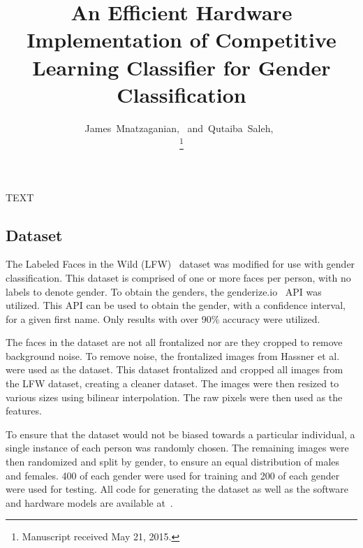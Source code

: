 \documentclass[10pt,journal]{IEEEtran}
\begin{document}
	
	\title{An Efficient Hardware Implementation of Competitive Learning Classifier for Gender Classification}
	
	\author{
		James~Mnatzaganian,~
        and~Qutaiba~Saleh,~%
	
		
		\thanks{Manuscript received May 21, 2015.}
	}
	
	

	\maketitle
	\IEEEdisplaynontitleabstractindextext
	
		TEXT
	
	\subsection{Dataset}
		The Labeled Faces in the Wild (LFW)~\cite{lfw} dataset was modified for use with gender classification. This dataset is comprised of one or more faces per person, with no labels to denote gender. To obtain the genders, the genderize.io~\cite{genderize} API was utilized. This API can be used to obtain the gender, with a confidence interval, for a given first name. Only results with over 90\% accuracy were utilized.
		
		The faces in the dataset are not all frontalized nor are they cropped to remove background noise. To remove noise, the frontalized images from Hassner et al.~\cite{frontalize} were used as the dataset. This dataset frontalized and cropped all images from the LFW dataset, creating a cleaner dataset. The images were then resized to various sizes using bilinear interpolation. The raw pixels were then used as the features.
		
		To ensure that the dataset would not be biased towards a particular individual, a single instance of each person was randomly chosen. The remaining images were then randomized and split by gender, to ensure an equal distribution of males and females. 400 of each gender were used for training and 200 of each gender were used for testing. All code for generating the dataset as well as the software and hardware models are available at~\cite{gitrepo}.
	
\end{document}
